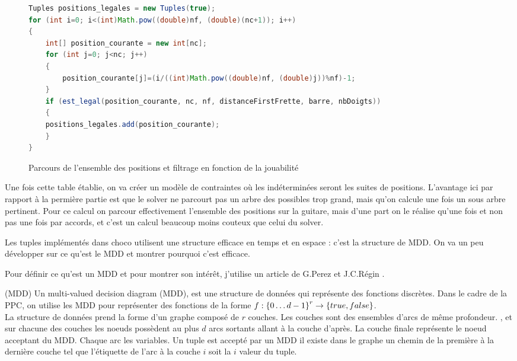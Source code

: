\begin{figure}[H]
  \begin{lstlisting}[language=Java]
Tuples positions_legales = new Tuples(true);
for (int i=0; i<(int)Math.pow((double)nf, (double)(nc+1)); i++)
{
	int[] position_courante = new int[nc];
	for (int j=0; j<nc; j++)
	{
		position_courante[j]=(i/((int)Math.pow((double)nf, (double)j))%nf)-1;	
	}
	if (est_legal(position_courante, nc, nf, distanceFirstFrette, barre, nbDoigts))
	{
    positions_legales.add(position_courante);
	}
}
\end{lstlisting}
  \caption{Parcours de l'ensemble des positions et filtrage en fonction de la
  jouabilité}
  \label{code:parcoursFiltrage}
\end{figure}

Une fois cette table établie, on va créer un modèle de contraintes où les
indéterminées seront les suites de positions.
L'avantage ici par rapport à la permière partie est que le solver ne parcourt 
pas un arbre des possibles trop grand, mais qu'on calcule une fois un sous
arbre pertinent. Pour ce calcul on parcour effectivement l'ensemble des
positions sur la guitare, mais d'une part on le réalise qu'une fois et non pas
une fois par accords, et c'est un calcul beaucoup moins couteux que celui du
solver.

Les tuples implémentés dans choco utilisent une structure efficace en temps et
en espace : c'est la structure de MDD. 
On va un peu développer sur ce qu'est le MDD et montrer pourquoi c'est efficace.

Pour définir ce qu'est un MDD et pour montrer son intérêt, j'utilise un article
de G.Perez et J.C.Régin \cite{PerezR16}.

\begin{defi}(MDD)
  \label{def:MDD}
  Un multi-valued decision diagram (MDD), est une structure de données qui
  représente des fonctions discrètes. Dans le cadre de la PPC, on utilise les
  MDD pour représenter des fonctions de la forme 
  $f : \left\{0\dots d-1\right\}^r \rightarrow 
  \left\{true, false\right\}$.\\
  La structure de données prend la forme d'un graphe composé de $r$ couches.
  Les couches sont des ensembles d'arcs de même profondeur.
  , et
  sur chacune des couches les noeuds possèdent au plus $d$ arcs sortants allant
  à la couche d'après. La couche finale représente le noeud acceptant du MDD.
  Chaque arc  les variables. Un tuple est accepté par
  un MDD \ssi il existe dans le graphe un chemin de la première à la dernière
  couche tel que l'étiquette de l'arc à la couche $i$ soit la $i$ valeur du
  tuple.
\end{defi}

